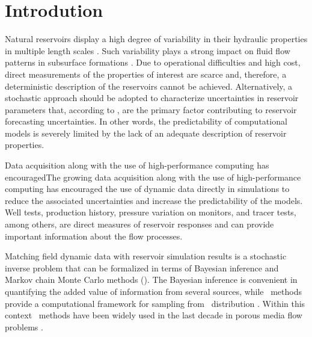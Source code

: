 \section{Introdution}
Natural reservoirs display a high degree of variability in their hydraulic properties in multiple length scales \citep{dagan89, gelhar93}.
Such variability plays a strong impact on fluid flow patterns in subsurface formations \citep{glimm92}.
Due to operational difficulties and high cost, direct measurements of the properties of interest are scarce and, therefore, a deterministic description of the reservoirs cannot be achieved.
Alternatively, a stochastic approach should be adopted to characterize uncertainties in reservoir parameters that, according to \cite{efendiev2006},  are the primary factor contributing to reservoir forecasting uncertainties.
In other words, the predictability of computational models is severely limited by the lack of an adequate description of reservoir properties.

Data acquisition along with the use of high-performance computing has encouragedThe growing data acquisition along with the use of high-performance computing has encouraged the use of dynamic data directly in simulations to reduce the associated uncertainties and increase the predictability of the models.
Well tests, production history, pressure variation on monitors, and tracer tests, among others, are direct measures of reservoir responses and can provide important information about the flow processes.

Matching field dynamic data with reservoir simulation results is a stochastic inverse problem that can be formalized in terms of Bayesian inference and Markov chain Monte Carlo methods (\mcmc).
The Bayesian inference is convenient in quantifying the added value of information from several sources, while \mcmc\ methods provide a computational framework for sampling from \apost\ distribution \citep{casella05, liu2008}.
Within this context \mcmc\ methods have been
widely used in the last decade in porous media flow problems
\citep{liu2003,efendiev05,efendiev2006,ma2008,dostert10,das10,mondal10,ginting11,ginting12,iglesias13,emerick2013}.
